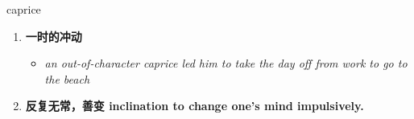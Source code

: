 
\begin{frame}
{\huge caprice}
\begin{center}
\begin{enumerate}\Large
  \item \textbf{一时的冲动}
  \begin{itemize}
    \item \em{\Large{an out-of-character caprice led him to take the day off from work to go to the beach}}
  \end{itemize}
  \item \textbf{反复无常，善变 inclination to change one's mind impulsively.}
\end{enumerate}
\end{center}
\end{frame}
